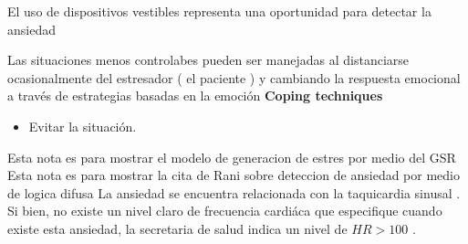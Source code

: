 \documentclass[letterpaper,12pt]{cicese}
\begin{document}
	El uso de dispositivos vestibles representa una oportunidad para detectar la ansiedad \citep{Miranda:2014:ADU:2676690.2676694}
	
	Las situaciones menos controlabes pueden ser manejadas al distanciarse ocasionalmente del estresador ( el paciente )  y cambiando la respuesta emocional a trav\'es de estrategias basadas en la emoci\'on
	\textbf{Coping techniques}

	\citep{li20121}
	\begin{itemize}
		\item Evitar la situaci\'on.
	\end{itemize}

	Esta nota es para mostrar el modelo de generacion de estres por medio del GSR \citep{Bakker2011}
	Esta nota es para mostrar la cita de Rani sobre deteccion de ansiedad por medio de logica difusa\citep{Rani2007323}
	La ansiedad se encuentra relacionada con la taquicardia sinusal \citep{EcgPractica}. Si bien, no existe un nivel claro de frecuencia cardi\'aca que especifique cuando existe esta ansiedad, la secretaria de salud indica un nivel de $HR > 100$ \citep{GPCSecSalud}.
        {\normalsize
		
                
        }

	
\end{document}
